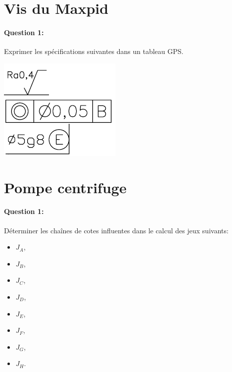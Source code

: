 \newpage



\newpage

\section{Vis du Maxpid}

\begin{minipage}{0.5\linewidth}

\paragraph{Question 1:} Exprimer les spécifications suivantes dans un tableau GPS.
\end{minipage}
\hfill
\begin{minipage}{0.45\linewidth}
\begin{center}
 \includegraphics[width=0.4\linewidth]{img/exo3.png}
\end{center}
\end{minipage}

\newpage



%

\newpage

\section{Pompe centrifuge}

\paragraph{Question 1:} Déterminer les chaînes de cotes influentes dans le calcul des jeux suivants:
\begin{itemize}
 \item $J_A$,
 \item $J_B$,
 \item $J_C$,
 \item $J_D$,
 \item $J_E$,
 \item $J_F$,
 \item $J_G$,
 \item $J_H$.
\end{itemize}




